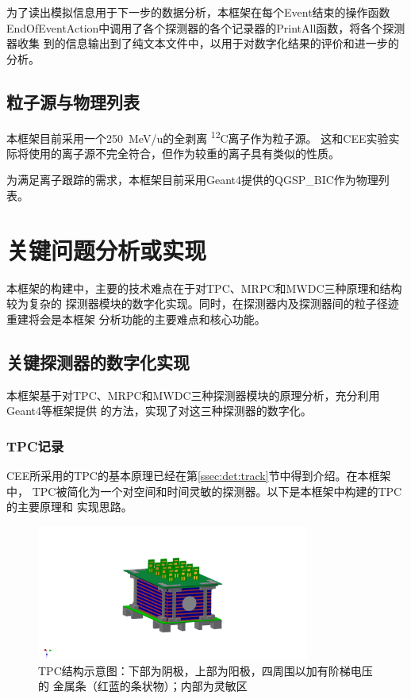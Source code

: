 \documentclass[bachelor,openany,oneside,color]{buaathesis}
\def\PrimaryParticle{\textsuperscript{12}C}
\begin{document}
为了读出模拟信息用于下一步的数据分析，本框架在每个Event结束的操作函数
EndOfEventAction中调用了各个探测器的各个记录器的PrintAll函数，将各个探测器收集
到的信息输出到了纯文本文件中，以用于对数字化结果的评价和进一步的分析。

\section{粒子源与物理列表}

本框架目前采用一个\SI{250}{\MeV/u}的全剥离 \PrimaryParticle 离子作为粒子源。
这和CEE实验实际将使用的离子源不完全符合，但作为较重的离子具有类似的性质。

为满足离子跟踪的需求，本框架目前采用Geant4提供的QGSP\_BIC作为物理列表。

\chapter{关键问题分析或实现}\label{chap:digi}

本框架的构建中，主要的技术难点在于对TPC、MRPC和MWDC三种原理和结构较为复杂的
探测器模块的数字化实现。同时，在探测器内及探测器间的粒子径迹重建将会是本框架
分析功能的主要难点和核心功能。

\section{关键探测器的数字化实现}\label{sec:digi}

本框架基于对TPC、MRPC和MWDC三种探测器模块的原理分析，充分利用Geant4等框架提供
的方法，实现了对这三种探测器的数字化。

\subsection{TPC记录}\label{ssec:digi:TPC}

CEE所采用的TPC的基本原理已经在第\ref{ssec:det:track}节中得到介绍。在本框架中，
TPC被简化为一个对空间和时间灵敏的探测器。以下是本框架中构建的TPC的主要原理和
实现思路。

\begin{figure}
	\centering
	\includegraphics[width=0.8\textwidth]{./resource/CEE-TPC-Overview.png}
	\caption{TPC结构示意图：下部为阴极，上部为阳极，四周围以加有阶梯电压的
		金属条（红蓝的条状物）；内部为灵敏区}
	\label{fig:det:TPC:Overview}
\end{figure}
\end{document}
